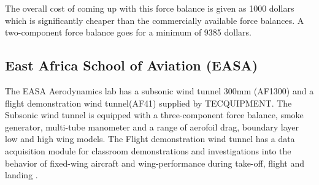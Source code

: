 The overall cost of coming up with this force balance is given as 1000 dollars which is significantly cheaper than the commercially available force balances. A two-component force balance goes for a minimum of 9385 dollars.
\subsection{East Africa School of Aviation (EASA)}
The EASA Aerodynamics lab has a subsonic wind tunnel 300mm (AF1300) and a flight demonstration wind tunnel(AF41) supplied by TECQUIPMENT. The Subsonic wind tunnel is equipped with a three-component force balance, smoke generator, multi-tube manometer and a range of aerofoil drag, boundary layer low and high wing models. The Flight demonstration wind tunnel has a data acquisition module for classroom demonstrations and investigations into the behavior of fixed-wing aircraft and wing-performance during take-off, flight and landing \cite{TEC}.

